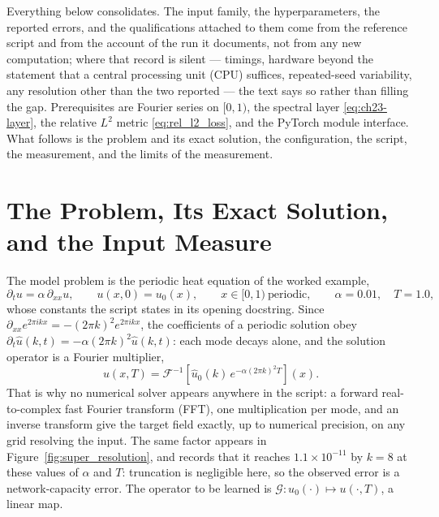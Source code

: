 Everything below consolidates. The input family, the hyperparameters, the reported
errors, and the qualifications attached to them come from the reference script and from
the account of the run it documents, not from any new computation; where that record is
silent --- timings, hardware beyond
the statement that a central processing unit (CPU) suffices, repeated-seed
variability, any resolution other than the two reported --- the text says so rather
than filling the gap. Prerequisites are Fourier series on $[0,1)$, the spectral layer
\eqref{eq:ch23-layer}, the relative $L^2$ metric \eqref{eq:rel_l2_loss}, and the
PyTorch module interface. What follows is the problem and its exact solution, the
configuration, the script, the measurement, and the limits of the measurement.

\section{The Problem, Its Exact Solution, and the Input Measure}
\label{sec:appb-problem}

The model problem is the periodic heat equation of the worked example,
\begin{equation}
  \label{eq:appb-pde}
  \partial_t u = \alpha\,\partial_{xx} u, \qquad u(x,0) = u_0(x), \qquad
  x \in [0,1) \ \text{periodic}, \qquad \alpha = 0.01,\quad T = 1.0,
\end{equation}
whose constants the script states in its opening docstring. Since
$\partial_{xx} e^{2\pi i k x} = -(2\pi k)^2 e^{2\pi i k x}$, the coefficients of a
periodic solution obey $\partial_t \hat{u}(k,t) = -\alpha (2\pi k)^2 \hat{u}(k,t)$:
each mode decays alone, and the solution operator is a Fourier multiplier,
\begin{equation}
  \label{eq:appb-multiplier}
  u(x,T) = \mathcal{F}^{-1}\!\left[ \hat{u}_0(k)\, e^{-\alpha (2\pi k)^2 T} \right](x).
\end{equation}
That is why no numerical solver appears anywhere in the script: a forward
real-to-complex fast Fourier transform (FFT), one multiplication per mode, and an
inverse transform give the target field exactly, up to numerical precision, on any
grid resolving the input. The same factor appears in Figure~\ref{fig:super_resolution},
and  records that it
reaches $1.1\times10^{-11}$ by $k=8$ at these values of $\alpha$ and $T$: truncation is
negligible here, so the observed error is a network-capacity error. The operator to be
learned is $\mathcal{G}\colon u_0(\cdot) \mapsto u(\cdot,T)$, a linear map.


